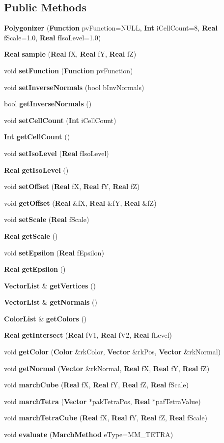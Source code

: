 \subsection*{Public Methods}
\begin{CompactItemize}
\item 
{\bf Polygonizer} ({\bf Function} pv\-Function=NULL, {\bf Int} i\-Cell\-Count=8, {\bf Real} f\-Scale=1.0, {\bf Real} f\-Iso\-Level=1.0)
\item 
{\bf Real} {\bf sample} ({\bf Real} f\-X, {\bf Real} f\-Y, {\bf Real} f\-Z)
\item 
void {\bf set\-Function} ({\bf Function} pv\-Function)
\item 
void {\bf set\-Inverse\-Normals} (bool b\-Inv\-Normals)
\item 
bool {\bf get\-Inverse\-Normals} ()
\item 
void {\bf set\-Cell\-Count} ({\bf Int} i\-Cell\-Count)
\item 
{\bf Int} {\bf get\-Cell\-Count} ()
\item 
void {\bf set\-Iso\-Level} ({\bf Real} f\-Iso\-Level)
\item 
{\bf Real} {\bf get\-Iso\-Level} ()
\item 
void {\bf set\-Offset} ({\bf Real} f\-X, {\bf Real} f\-Y, {\bf Real} f\-Z)
\item 
void {\bf get\-Offset} ({\bf Real} \&f\-X, {\bf Real} \&f\-Y, {\bf Real} \&f\-Z)
\item 
void {\bf set\-Scale} ({\bf Real} f\-Scale)
\item 
{\bf Real} {\bf get\-Scale} ()
\item 
void {\bf set\-Epsilon} ({\bf Real} f\-Epsilon)
\item 
{\bf Real} {\bf get\-Epsilon} ()
\item 
{\bf Vector\-List} \& {\bf get\-Vertices} ()
\item 
{\bf Vector\-List} \& {\bf get\-Normals} ()
\item 
{\bf Color\-List} \& {\bf get\-Colors} ()
\item 
{\bf Real} {\bf get\-Intersect} ({\bf Real} f\-V1, {\bf Real} f\-V2, {\bf Real} f\-Level)
\item 
void {\bf get\-Color} ({\bf Color} \&rk\-Color, {\bf Vector} \&rk\-Pos, {\bf Vector} \&rk\-Normal)
\item 
void {\bf get\-Normal} ({\bf Vector} \&rk\-Normal, {\bf Real} f\-X, {\bf Real} f\-Y, {\bf Real} f\-Z)
\item 
void {\bf march\-Cube} ({\bf Real} f\-X, {\bf Real} f\-Y, {\bf Real} f\-Z, {\bf Real} f\-Scale)
\item 
void {\bf march\-Tetra} ({\bf Vector} $\ast$pak\-Tetra\-Pos, {\bf Real} $\ast$paf\-Tetra\-Value)
\item 
void {\bf march\-Tetra\-Cube} ({\bf Real} f\-X, {\bf Real} f\-Y, {\bf Real} f\-Z, {\bf Real} f\-Scale)
\item 
void {\bf evaluate} ({\bf March\-Method} e\-Type=MM\_\-TETRA)
\end{CompactItemize}
